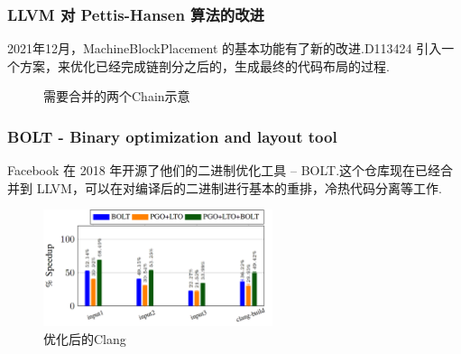 \begin{frame}
    \frametitle{LLVM 对 Pettis-Hansen 算法的改进}

    2021年12月，MachineBlockPlacement 的基本功能有了新的改进.D113424\cite{llvmexttspbbl2021} 引入一个方案，来优化已经完成链剖分之后的，生成最终的代码布局的过程.

    \begin{figure}
        
        \caption{需要合并的两个Chain示意}
    \end{figure}

\end{frame}

\begin{frame}
    \frametitle{BOLT - Binary optimization and layout tool}

    Facebook 在 2018 年开源了他们的二进制优化工具 -- BOLT\cite{facebook2018bolt, panchenko2019bolt}.这个仓库现在已经合并到 LLVM，可以在对编译后的二进制进行基本的重排，冷热代码分离等工作.

    \begin{figure}
        \centering
        \includegraphics[width=0.6\textwidth]{images/perf_improv_clang.png}
        \caption{优化后的Clang}
    \end{figure}

\end{frame}
